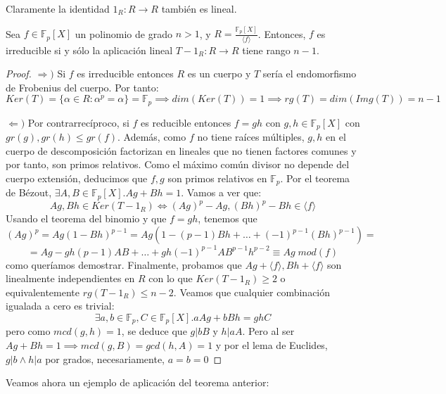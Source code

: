 Claramente la identidad $1_R:R \to R$ también es lineal. 

\begin{theorem}
Sea $f \in \mathbb{F}_p[X]$ un polinomio de grado $n > 1$, y  $R = \frac{\mathbb{F}_p[X]}{\langle f \rangle}$. Entonces, $f$ es irreducible si y sólo la aplicación lineal $T - 1_R: R \to R$ tiene rango $n-1$.  
\end{theorem}
\begin{proof}
$\Rightarrow)$ Si $f$ es irreducible entonces $R$ es un cuerpo y $T$ sería el endomorfismo de Frobenius del cuerpo. Por tanto: $$Ker(T) = \{\alpha \in R: \alpha^p = \alpha \} = \mathbb{F}_p \implies dim(Ker(T)) = 1 \implies rg(T) = dim(Img(T)) = n-1$$

$\Leftarrow)$ Por contrarrecíproco, si $f$ es reducible entonces $f = gh$ con $g,h \in \mathbb{F}_p[X]$ con $gr(g),gr(h) \le gr(f)$. Además, como $f$ no tiene raíces múltiples, $g,h$ en el cuerpo de descomposición factorizan en lineales que no tienen factores comunes y por tanto, son primos relativos. Como el máximo común divisor no depende del cuerpo extensión, deducimos que $f,g$ son primos relativos en $\mathbb{F}_p$. Por el teorema de Bézout, $\exists A,B \in \mathbb{F}_p[X].Ag+Bh = 1$. Vamos a ver que: $$Ag,Bh \in Ker(T - 1_R) \iff (Ag)^p - Ag,(Bh)^p - Bh \in \langle f \rangle$$ Usando el teorema del binomio y que $f = gh$, tenemos que $$(Ag)^p = Ag(1-Bh)^{p-1} = Ag(1-(p-1)Bh+ \ldots + (-1)^{p-1}(Bh)^{p-1}) =  $$ $$ = Ag - gh(p-1)AB+\ldots+gh(-1)^{p-1}AB^{p-1}h^{p-2} \equiv Ag \; mod(f)$$ como queríamos demostrar. Finalmente, probamos que $Ag + \langle f \rangle, Bh + \langle f \rangle$ son linealmente independientes en $R$ con lo que $Ker(T - 1_R) \ge 2$ o equivalentemente $rg(T - 1_R) \le n-2$. Veamos que cualquier combinación igualada a cero es trivial: $$\exists a,b \in \mathbb{F}_p,C \in \mathbb{F}_p[X].aAg + bBh = ghC$$ pero como $mcd(g,h) = 1$, se deduce que $g|bB$ y $h|aA$. Pero al ser $Ag + Bh = 1 \implies mcd(g,B) = gcd(h,A) = 1$ y por el lema de Euclides, $g|b \land h|a$ por grados, necesariamente, $a = b = 0$
\end{proof}

Veamos ahora un ejemplo de aplicación del teorema anterior:

